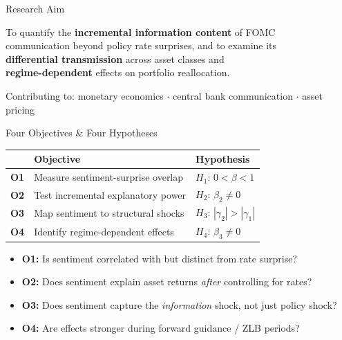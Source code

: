 \documentclass[aspectratio=169, 11pt]{beamer}
\begin{document}
\begin{frame}{Research Aim}
  \begin{center}
    \begin{tcolorbox}[blocksty, colback=myblue!8, colframe=myblue!85,
      coltitle=white, width=0.92\textwidth,
      title={Research Aim}]
      \normalsize
      To quantify the \textbf{incremental information content} of FOMC \\
      communication beyond policy rate surprises, and to examine its \\
      \textbf{differential transmission} across asset classes and \\
      \textbf{regime-dependent} effects on portfolio reallocation.
    \end{tcolorbox}
  \end{center}

  \vspace{0.3em}
  \begin{center}
    \small Contributing to: monetary economics $\cdot$ central bank communication $\cdot$ asset pricing
  \end{center}
\end{frame}

\begin{frame}{Four Objectives \& Four Hypotheses}
  \centering
  \footnotesize
  \begin{tabularx}{\textwidth}{>{\bfseries}l X l}
    \toprule
    & \textbf{Objective} & \textbf{Hypothesis} \\
    \midrule
    O1 & Measure sentiment-surprise overlap & $H_1$: $0 < \beta < 1$ \\
    O2 & Test incremental explanatory power & $H_2$: $\beta_2 \neq 0$ \\
    O3 & Map sentiment to structural shocks & $H_3$: $|\gamma_2| > |\gamma_1|$ \\
    O4 & Identify regime-dependent effects & $H_4$: $\beta_3 \neq 0$ \\
    \bottomrule
  \end{tabularx}

  \vspace{0.5em}
  \begin{itemize}
    \item<1-> \textbf{O1:} Is sentiment correlated with but distinct from rate surprise?
    \item<2-> \textbf{O2:} Does sentiment explain asset returns \emph{after} controlling for rates?
    \item<3-> \textbf{O3:} Does sentiment capture the \emph{information} shock, not just policy shock?
    \item<4-> \textbf{O4:} Are effects stronger during forward guidance / ZLB periods?
  \end{itemize}
\end{frame}
\end{document}

